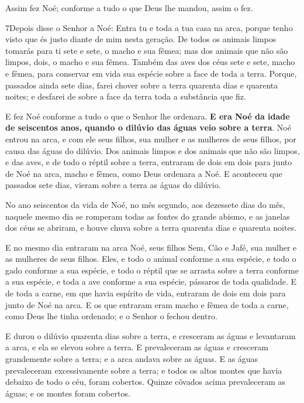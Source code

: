 Assim fez Noé; conforme a tudo o que Deus lhe mandou, assim o
fez.

\smallskip

\lettrine{7} Depois disse o Senhor a Noé: Entra tu e toda a
tua casa na arca, porque tenho visto que és justo diante de mim
nesta geração. De todos os animais limpos tomarás para ti sete e
sete, o macho e sua fêmea; mas dos animais que não são limpos, dois,
o macho e sua fêmea. Também das aves dos céus sete e sete, macho
e fêmea, para conservar em vida sua espécie sobre a face de toda a
terra. Porque, passados ainda sete dias, farei chover sobre a
terra quarenta dias e quarenta noites; e desfarei de sobre a face da
terra toda a substância que fiz.

E fez Noé conforme a tudo o que o Senhor lhe ordenara.
\textbf{E era Noé da idade de seiscentos anos, quando o dilúvio
das águas veio sobre a terra}. Noé entrou na arca, e com ele
seus filhos, sua mulher e as mulheres de seus filhos, por causa das
águas do dilúvio. Dos animais limpos e dos animais que não são
limpos, e das aves, e de todo o réptil sobre a terra, entraram
de dois em dois para junto de Noé na arca, macho e fêmea, como Deus
ordenara a Noé. E aconteceu que passados sete dias, vieram
sobre a terra as águas do dilúvio.

No ano seiscentos da vida de Noé, no mês segundo, aos dezessete
dias do mês, naquele mesmo dia se romperam todas as fontes do grande
abismo, e as janelas dos céus se abriram, e houve chuva sobre
a terra quarenta dias e quarenta noites.

E no mesmo dia entraram na arca Noé, seus filhos Sem, Cão e Jafé,
sua mulher e as mulheres de seus filhos. Eles, e todo o
animal conforme a sua espécie, e todo o gado conforme a sua espécie,
e todo o réptil que se arrasta sobre a terra conforme a sua espécie,
e toda a ave conforme a sua espécie, pássaros de toda qualidade.
E de toda a carne, em que havia espírito de vida, entraram de
dois em dois para junto de Noé na arca. E os que entraram
eram macho e fêmea de toda a carne, como Deus lhe tinha ordenado; e
o Senhor o fechou dentro.

E durou o dilúvio quarenta dias sobre a terra, e cresceram as
águas e levantaram a arca, e ela se elevou sobre a terra. E
prevaleceram as águas e cresceram grandemente sobre a terra; e a
arca andava sobre as águas. E as águas prevaleceram
excessivamente sobre a terra; e todos os altos montes que havia
debaixo de todo o céu, foram cobertos. Quinze côvados acima
prevaleceram as águas; e os montes foram cobertos.

